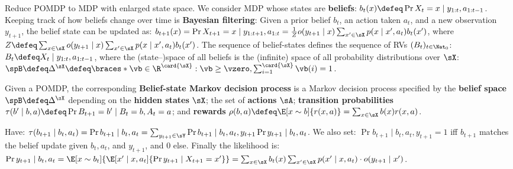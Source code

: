 Reduce POMDP to MDP with enlarged state space. We consider MDP whose states are \textbf{beliefs}: $b_t(x) \defeq \Pr{X_t = x \mid y_{1:t}, a_{1:t-1}}$. Keeping track of how beliefs change over time is \textbf{Bayesian filtering}: Given a prior belief $b_t$, an action taken $a_t$, and a new observation $y_{t+1}$, the belief state can be updated as: $b_{t+1}(x) = \Pr{X_{t+1} = x \mid y_{1:t+1}, a_{1:t}} = \frac{1}{Z} o(y_{t+1} \mid x) \sum_{x' \in \sX} p(x \mid x', a_t) b_t(x')$, where $Z \defeq \sum_{x \in \sX} o(y_{t+1} \mid x) \sum_{x' \in \sX} p(x \mid x', a_t) b_t(x')$.
The sequence of belief-states defines the sequence of RVs $(B_t)_{t\in\Nat_0}$:$ B_t \defeq X_t \mid y_{1:t}, a_{1:t-1}$, where the (state--)space of all beliefs is the (infinite) space of all probability distributions over $\sX$: $\spB \defeq \Delta^{\sX} \defeq \braces*{\vb \in \R^{\card{\sX}} : \vb \geq \vzero, \textstyle\sum_{i=1}^{\card{\sX}} \vb(i) = 1}$.
\begin{framed}
    Given a POMDP, the corresponding \textbf{Belief-state Markov decision process} is a Markov decision process specified by the \textbf{belief space} $\spB \defeq \Delta^{\sX}$ depending on the \textbf{hidden states} $\sX$; the set of \textbf{actions} $\sA$; \textbf{transition probabilities} $\tau(b' \mid b, a) \defeq \Pr{B_{t+1} = b' \mid B_t = b, A_t = a}$; and \textbf{rewards} $\rho(b, a) \defeq \E[x \sim b]{r(x, a)} = \sum_{x \in \sX} b(x) r(x, a)$.
\end{framed}
Have: $\tau(b_{t+1} \mid b_t, a_t) = \Pr{b_{t+1} \mid b_t, a_t} = \sum_{y_{t+1} \in \sY} \Pr{b_{t+1} \mid b_t, a_t, y_{t+1}} \Pr{y_{t+1} \mid b_t, a_t}$. We also set: $\Pr{b_{t+1} \mid b_t, a_t, y_{t+1}} = 1$ iff $b_{t+1}$ matches the belief update given $b_t, a_t$, and $y_{t+1}$, and 0 else. Finally the likelihood is: $\Pr{y_{t+1} \mid b_t, a_t} = \E[x \sim b_t]{\E[x' \mid x, a_t]{\Pr{y_{t+1} \mid X_{t+1} = x'}}} = \sum_{x \in \sX} b_t(x) \sum_{x' \in \sX} p(x' \mid x, a_t) \cdot o(y_{t+1} \mid x')$.